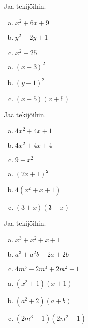 \begin{tehtavasivu}
\begin{tehtava}
    Jaa tekijöihin.
    \begin{enumerate}[a)]
        \item $x^2+6x+9$
        \item $y^2 - 2y+1$
        \item $x^2 -25$
    \end{enumerate}
    \begin{vastaus}
        \begin{enumerate}[a)]
        \item $(x+3)^2$
        \item $(y-1)^2$
        \item $(x-5)(x+5)$
        \end{enumerate}
    \end{vastaus}
\end{tehtava}

\begin{tehtava}
    Jaa tekijöihin.
    \begin{enumerate}[a)]
        \item $4x^2 +4x +1$
        \item $4x^2 +4x +4$
        \item $9-x^2$
          \end{enumerate}
    \begin{vastaus}
        \begin{enumerate}[a)]
        \item $(2x+1)^2$
        \item $4(x^2 +x +1)$
        \item $(3+x)(3-x)$
        \end{enumerate}
    \end{vastaus}
\end{tehtava}

\begin{tehtava}
    Jaa tekijöihin.
    \begin{enumerate}[a)]
        \item $x^3 +x^2 +x +1$
        \item $a^3 +a^2b +2a +2b$
        \item $4m^5 -2m^3 +2m^2 -1$
    \end{enumerate}
    \begin{vastaus}
        \begin{enumerate}[a)]
        \item $(x^2+1)(x+1)$
        \item $(a^2+2)(a+b)$
        \item $(2m^3 -1)(2m^2 -1)$
        \end{enumerate}
    \end{vastaus}
\end{tehtava}


\end{tehtavasivu}
